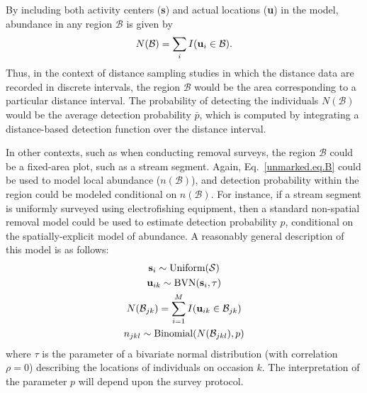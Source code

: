 By including both activity centers ({\bf s}) and actual locations
({\bf u}) in the model, abundance in any region
$\mathcal{B}$ is given by
\begin{equation}
N(\mathcal{B}) = \sum_i I({\bf u}_i \in \mathcal{B}).
\label{unmarked.eq.B}
\end{equation}
Thus, in the context of distance sampling studies in which the
distance data are recorded in discrete intervals, the region
$\mathcal{B}$ would be the area corresponding to a particular distance
interval. The probability of detecting the individuals
$N(\mathcal{B})$ would be the average detection probability $\bar{p}$,
which is computed by integrating a distance-based detection function
over the distance interval.

In other contexts, such as when conducting removal surveys, the region
$\mathcal{B}$ could be a fixed-area plot, such as a stream
segment. Again, Eq.~\ref{unmarked.eq.B} could be used to model local
abundance ($n(\mathcal{B})$), and detection probability within the region could be
modeled conditional on $n(\mathcal{B})$. For instance, if a stream
segment is uniformly surveyed using electrofishing equipment, then a
standard non-spatial removal model could be used to estimate detection
probability $p$, conditional on the spatially-explicit model of
abundance. A reasonably general description of this model is as
follows:
\begin{gather*}
  {\bf s}_i \sim \text{Uniform}(\mathcal{S}) \\
  {\bf u}_{ik} \sim \text{BVN}({\bf s}_i, \tau) \\
  N(\mathcal{B}_{jk}) = \sum_{i=1}^M I({\bf u}_{ik} \in \mathcal{B}_{jk}) \\
  n_{jkl} \sim \text{Binomial}(N(\mathcal{B}_{jkl}), p)
\end{gather*}
where $\tau$ is the parameter of a bivariate normal distribution (with
correlation $\rho=0$) describing the locations of individuals on occasion
$k$. The interpretation of the parameter $p$ will depend upon the
survey protocol.

